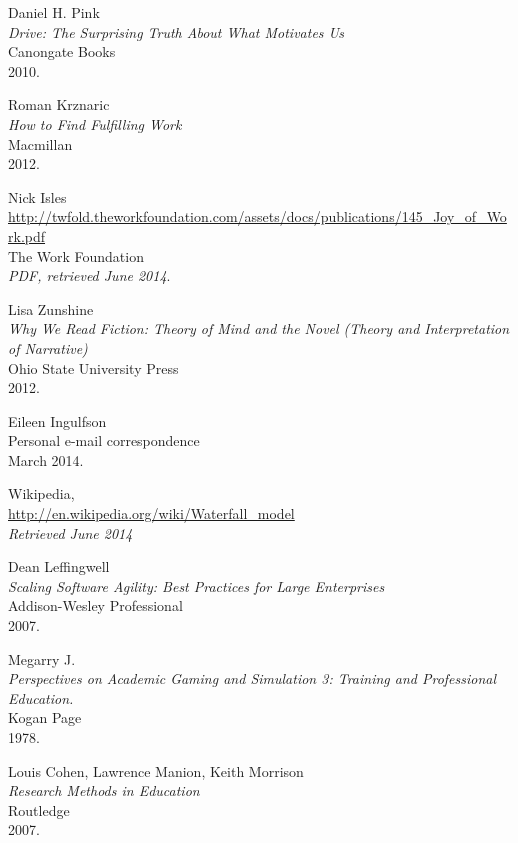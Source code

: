 \begin{thebibliography}{99}
  Daniel H. Pink \\
  \emph{Drive: The Surprising Truth About What Motivates Us} \\
  Canongate Books \\
  2010.

  Roman Krznaric \\
  \emph{How to Find Fulfilling Work} \\
  Macmillan \\
  2012.

  Nick Isles \\
  \url{http://twfold.theworkfoundation.com/assets/docs/publications/145_Joy_of_Work.pdf} \\
  The Work Foundation \\
  \emph{PDF, retrieved June 2014}.

  Lisa Zunshine \\
  \emph{Why We Read Fiction: Theory of Mind and the Novel (Theory and Interpretation of Narrative)} \\
  Ohio State University Press \\
  2012.

  Eileen Ingulfson \\
  Personal e-mail correspondence \\
  March 2014.

  Wikipedia, \\
  \url{http://en.wikipedia.org/wiki/Waterfall_model} \\
  \emph{Retrieved June 2014}

  Dean Leffingwell \\
  \emph{Scaling Software Agility: Best
Practices for Large Enterprises} \\
  Addison-Wesley Professional \\
  2007.

  Megarry J. \\
  \emph{Perspectives on Academic Gaming and Simulation 3: Training and Professional Education.} \\
  Kogan Page \\
  1978.

  Louis Cohen, Lawrence Manion, Keith Morrison \\
  \emph{Research Methods in Education} \\
  Routledge \\
  2007.


\end{thebibliography}
